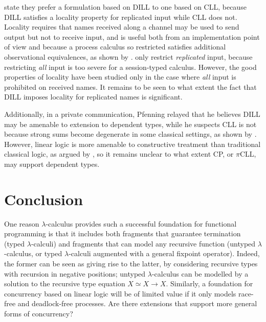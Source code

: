 \documentclass{jfp1}
\begin{document}
\citet{CairesEtAl12b} state they prefer a formulation based on DILL to
one based on CLL, because DILL satisfies a locality property for
replicated input while CLL does not.  Locality requires that names
received along a channel may be used to send output but not to receive
input, and is useful both from an implementation point of view and
because a process calculus so restricted satisfies additional
observational equivalences, as shown by \citet{MerroSangiorgi04}.
\citet{CairesEtAl12b} only restrict \emph{replicated} input, because
restricting \emph{all} input is too severe for a session-typed calculus.
However, the good properties of locality have been studied only in the
case where \emph{all} input is prohibited on received names.  It
remains to be seen to what extent the fact that DILL imposes locality
for replicated names is significant.

Additionally, in a private communication, Pfenning relayed that he
believes DILL may be amenable to extension to dependent types, while
he suspects CLL is not because strong sums become degenerate in some
classical settings, as shown by \citet{Herbelin05}.  However,
linear logic is more amenable to constructive treatment than
traditional classical logic, as argued by \citet{Girard91},
so it remains unclear to what extent CP, or $\pi$CLL, may
support dependent types.


\section{Conclusion}
\label{sec:conclusion}

One reason $\lambda$-calculus provides such a successful foundation for
functional programming is that it includes both fragments that
guarantee termination (typed $\lambda$-calculi) and fragments
that can model any recursive function (untyped $\lambda$-calculus, or
typed $\lambda$-calculi augmented with a general fixpoint operator).
Indeed, the former can be seen as giving rise to the latter, by
considering recursive types with recursion in negative positions;
untyped $\lambda$-calculus can be modelled by a solution to the
recursive type equation $X \simeq X \to X$.
Similarly, a foundation for concurrency based on linear logic will be of
limited value if it only models race-free and deadlock-free processes.  Are there
extensions that support more general forms of concurrency?
\end{document}
